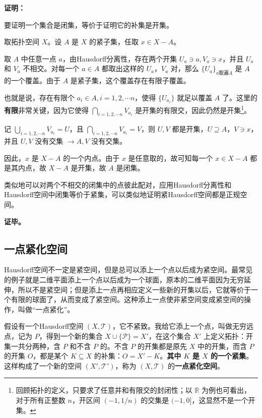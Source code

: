 \textbf{证明：}

要证明一个集合是闭集，等价于证明它的补集是开集。

取拓扑空间 $X$。设 $A$ 是 $X$ 的紧子集，任取 $x\in X-A$。

取 $A$ 中任意一点 $a$，由Hausdorff分离性，存在两个开集 $U_a\ni a, V_a\ni x$，并且 $U_a$ 和 $V_a$ 不相交。对每一个 $a\in A$ 都取出这样的 $U_a$，$V_a$ 对，那么 $\{U_a\}_{a\text{取遍}A}$ 是 $A$ 的一个覆盖。由于 $A$ 是紧子集，这个覆盖存在有限子覆盖。

也就是说，存在有限个 $a_i\in A, i=1, 2, \cdots n$，使得 $\{U_{a_i}\}$ 就足以覆盖 $A$ 了。这里的\textbf{有限}非常关键，因为它使得 $\bigcap\limits_{i=1,2, \cdots n}V_{a_i}$ 是开集的有限交，因此仍然是开集\footnote{回顾拓扑的定义，只要求了任意并和有限交的封闭性；以 $\mathbb{R}$ 为例也可看出，对于所有正整数 $n$，开区间 $(-1,1/n)$ 的交集是 $(-1, 0]$，这显然不是一个开集。}。

记 $\bigcup\limits_{i=1,2, \cdots n}V_{a_i}=U$，且 $\bigcap\limits_{i=1,2, \cdots n}V_{a_i}=V$，则 $U, V$ 都是开集，$U\supseteq A$，$V\ni x$，并且 $U, V$ 没有交集 $\rightarrow A, V$ 没有交集。

因此，$x$ 是 $X-A$ 的一个内点。由于 $x$ 是任意取的，故可知每一个 $x\in X-A$ 都是其内点，故 $X-A$ 是开集，故 $A$ 是闭集。

类似地可以对两个不相交的闭集中的点彼此配对，应用Hausdorff分离性和Hausdorff空间中闭集等价于紧集，可以类似地证明紧Hausdorff空间都是正规空间。


\textbf{证毕。}

\subsection{一点紧化空间}

Hausdorff空间不一定是紧空间，但是总可以添上一个点以后成为紧空间。最常见的例子就是二维平面添上一个点以后成为一个球面，原本的二维平面因为无穷延伸，所以不是紧空间；但是添上一点再相应定义一些新的开集以后，它就等价于一个有限的球面了，从而变成了紧空间。这种添上一点使非紧空间变成紧空间的操作，叫做“一点紧化”。

假设有一个Hausdorff空间 $(X, \mathcal{T})$，它不紧致。我给它添上一个点，叫做无穷远点，记为 $P$，得到一个新的集合 $X\cup \{\mathcal{P}\}=X'$，在这个集合 $X'$ 上定义拓扑：开集一共分两种，含 $P$ 和不含 $P$ 的。不含 $P$ 的开集都是原先 $X$ 中的开集，而含 $P$ 的开集 $O$，都是某个 $K\subseteq X$ 的补集：$O=X'-K$。\textbf{其中 $K$ 是 $X$ 的一个紧集}。这样构成了一个新的空间 $(X', \mathcal{T}')$，称为 $(X, \mathcal{T})$ 的\textbf{一点紧化空间}。

